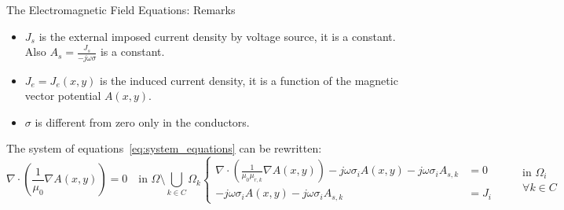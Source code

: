 \documentclass[aspectratio=54,xcolor=dvipsnames]{beamer}
\begin{document}
\begin{frame}{The Electromagnetic Field Equations: Remarks}
    \begin{footnotesize}
    \begin{itemize}[]
        \item $J_s$ is the external imposed current density by voltage source, it is a constant. Also $A_s = \frac{J_s}{- j \omega \sigma}$ is a constant.
        \item $J_e = J_e(x,y)$ is the induced current density, it is a function of the magnetic vector potential $A(x,y)$.
        \item $\sigma$ is different from zero only in the conductors.  
    \end{itemize}
    The system of equations~\eqref{eq:system_equations} can be rewritten:
    \begin{subequations}
    \begin{equation}
        \nabla \cdot \left( \frac{1}{\mu_0} \nabla A(x,y) \right)  = 0 \quad \text{in } \Omega \setminus \bigcup_{k \in C} \Omega_k
    \end{equation}
    \begin{equation}
        \left\{
        \begin{aligned}
        \nabla \cdot \left( \frac{1}{\mu_0\mu_{r,k}} \nabla A(x,y) \right) - j\omega \sigma_i A(x,y) - j\omega \sigma_i A_{s,k} &= 0 
        \\[1em]
        - j\omega \sigma_i A(x,y) - j\omega \sigma_i A_{s,k} &= J_i 
        \end{aligned}
        \right.
        \qquad             
        \begin{array}{l}
            \text{in } \Omega_i \\
            \forall k \in C
        \end{array}
    \end{equation}
    \end{subequations}
    \end{footnotesize}
\end{frame}
\end{document}
